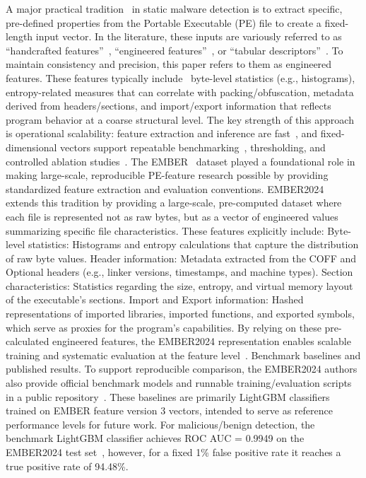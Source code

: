 \documentclass[conference]{IEEEtran}
\begin{document}
A major practical tradition~\cite{HP20182018} in static malware detection is to extract specific, pre-defined properties from the Portable Executable (PE) file to create a fixed-length input vector.
In the literature, these inputs are variously referred to as ``handcrafted features''~\cite{MT2025,EDS2020}, ``engineered features''~\cite{HP20182018}, or ``tabular descriptors''~\cite{JMGPR2024}.
To maintain consistency and precision, this paper refers to them as engineered features.
These features typically include~\cite{KBSSSK2025} byte-level statistics (e.g., histograms), entropy-related measures that can correlate with packing/obfuscation, metadata derived from headers/sections, and import/export information that reflects program behavior at a coarse structural level.
The key strength of this approach is operational scalability: feature extraction and inference are fast~\cite{EDS2020}, and fixed-dimensional vectors support repeatable benchmarking~\cite{JMGPR2024}, thresholding, and controlled ablation studies~\cite{AQPWPWCR2022}.
The EMBER~\cite{HP20182018} dataset played a foundational role in making large-scale, reproducible PE-feature research possible by providing standardized feature extraction and evaluation conventions.
EMBER2024~\cite{JMGPR2024} extends this tradition by providing a large-scale, pre-computed dataset where each file is represented not as raw bytes, but as a vector of engineered values summarizing specific file characteristics.
These features explicitly include:
Byte-level statistics: Histograms and entropy calculations that capture the distribution of raw byte values.
Header information: Metadata extracted from the COFF and Optional headers (e.g., linker versions, timestamps, and machine types).
Section characteristics: Statistics regarding the size, entropy, and virtual memory layout of the executable's sections.
Import and Export information: Hashed representations of imported libraries, imported functions, and exported symbols, which serve as proxies for the program's capabilities.
By relying on these pre-calculated engineered features, the EMBER2024 representation enables scalable training and systematic evaluation at the feature level~\cite{JMGPR2024,HP20182018}.
Benchmark baselines and published results.
To support reproducible comparison, the EMBER2024 authors also provide official benchmark models and runnable training/evaluation scripts in a public repository~\cite{JMGPR2024,ember2024github}.
These baselines are primarily LightGBM classifiers trained on EMBER feature version 3 vectors, intended to serve as reference performance levels for future work.
For malicious/benign detection, the benchmark LightGBM classifier achieves ROC AUC = 0.9949 on the EMBER2024 test set~\cite{JMGPR2024},
however, for a fixed 1\% false positive rate it reaches a true positive rate of 94.48\%.
\end{document}
